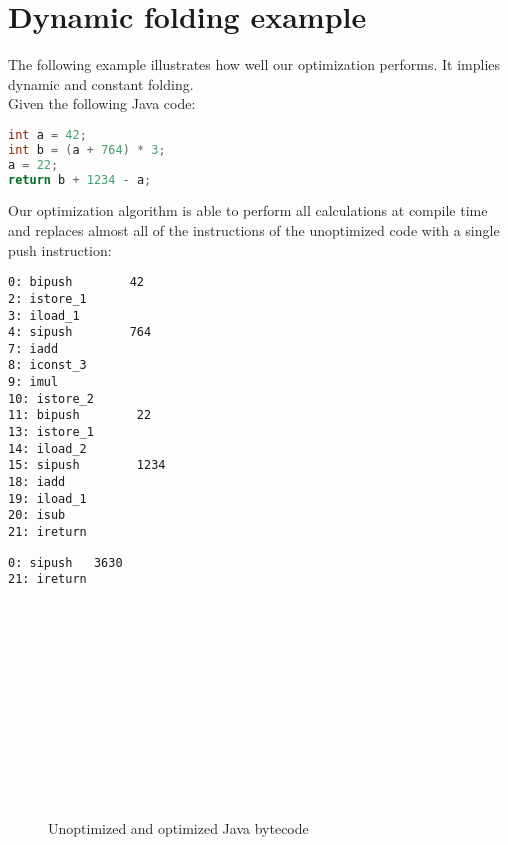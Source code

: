 \section{Dynamic folding example}
\label{sec:example}

The following example illustrates how well our optimization performs. It implies dynamic and constant folding.\\

Given the following Java code:
 
\begin{lstlisting}[language=Java]
int a = 42;
int b = (a + 764) * 3;
a = 22;
return b + 1234 - a; 
\end{lstlisting}

Our optimization algorithm is able to perform all calculations at compile time and replaces almost all of the instructions of the unoptimized code with a single push instruction:

\newsavebox{\unoptimized}
\begin{lrbox}{\unoptimized}
\begin{lstlisting}[basicstyle=\small]
0: bipush        42
2: istore_1
3: iload_1
4: sipush        764
7: iadd
8: iconst_3
9: imul
10: istore_2
11: bipush        22
13: istore_1
14: iload_2
15: sipush        1234
18: iadd
19: iload_1
20: isub
21: ireturn
\end{lstlisting}
\end{lrbox}

\newsavebox{\optimized}
\begin{lrbox}{\optimized}
\begin{lstlisting}[showlines=true, basicstyle=\small]
0: sipush	3630
21: ireturn














\end{lstlisting}
\end{lrbox}

\begin{figure}[h!]
	\centering
	\subfloat[Unoptimized]{\usebox{\unoptimized}}
	\hspace{0.5cm}\vline\hspace{0.5cm}
	\subfloat[Optimized]{\usebox{\optimized}}
	\caption{Unoptimized and optimized Java bytecode}
\end{figure}